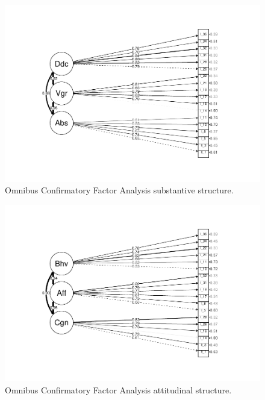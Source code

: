 \documentclass[
  english,
  man]{apa6}
\begin{document}
\begin{figure}
\centering
\includegraphics{EngagementPaper_files/figure-latex/semplotsub-1.pdf}
\caption{\label{fig:semplotsub}Omnibus Confirmatory Factor Analysis substantive structure.}
\end{figure}

\begin{figure}
\centering
\includegraphics{EngagementPaper_files/figure-latex/semplotatt-1.pdf}
\caption{\label{fig:semplotatt}Omnibus Confirmatory Factor Analysis attitudinal structure.}
\end{figure}
\end{document}
